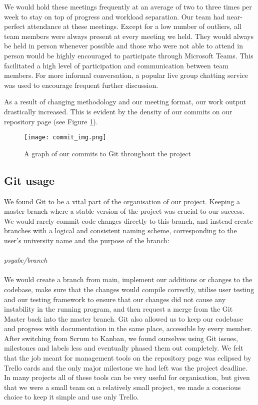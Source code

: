 \documentclass[a4paper]{article}
\begin{document}
We would hold these meetings frequently at an average of two to three times per week to stay on top of progress and workload separation. Our team had near-perfect attendance at these meetings. Except for a low number of outliers, all team members were always present at every meeting we held. They would always be held in person whenever possible and those who were not able to attend in person would be highly encouraged to participate through Microsoft Teams. This facilitated a high level of participation and communication between team members. For more informal conversation, a popular live group chatting service was used to encourage frequent further discussion. 

As a result of changing methodology and our meeting format, our work output drastically increased. This is evident by the density of our commits on our repository page (see Figure \ref{fig:commit_img}).

\begin{figure}[H]
    \centering
    \texttt{[image: commit\_img.png]}
    \caption{A graph of our commits to Git throughout the project}
    \label{fig:commit_img}
\end{figure}

\subsection{Git usage}
We found Git to be a vital part of the organisation of our project. Keeping a master branch where a stable version of the project was crucial to our success. We would rarely commit code changes directly to this branch, and instead create branches with a logical and consistent naming scheme, corresponding to the user’s university name and the purpose of the branch: 
\\ \\
\textit{psyabc/branch} 
\\ \\
We would create a branch from main, implement our additions or changes to the codebase, make sure that the changes would compile correctly, utilise user testing and our testing framework to ensure that our changes did not cause any instability in the running program, and then request a merge from the Git Master back into the master branch. Git also allowed us to keep our codebase and progress with documentation in the same place, accessible by every member. 
After switching from Scrum to Kanban, we found ourselves using Git issues, milestones and labels less and eventually phased them out completely. We felt that the job meant for management tools on the repository page was eclipsed by Trello cards and the only major milestone we had left was the project deadline. In many projects all of these tools can be very useful for organisation, but given that we were a small team on a relatively small project, we made a conscious choice to keep it simple and use only Trello.
\end{document}

